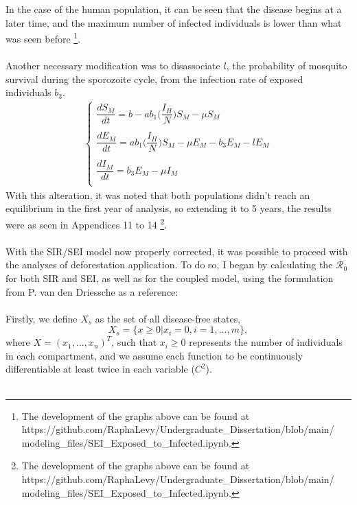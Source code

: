 In the case of the human population, it can be seen that the disease begins 
at a later time, and the maximum number of infected individuals is lower than
what was seen before
\footnote{The development of the graphs above can be found at 
https://github.com/RaphaLevy/Undergraduate\_Dissertation/blob/main/
\\modeling\_files/SEI\_Exposed\_to\_Infected.ipynb.}.
\\\\
Another necessary modification was to disassociate $l$, the probability of mosquito 
survival during the sporozoite cycle, from the infection rate of exposed individuals $b_3$.
\begin{gather*}
        \begin{cases}
        \dfrac{dS_M}{dt} = b - ab_1\bigg(\dfrac{I_H}{N}\bigg)S_M - \mu S_M\\
        \\
        \dfrac{dE_M}{dt} = ab_1\bigg(\dfrac{I_H}{N}\bigg)S_M - \mu E_M - b_3E_M -lE_M\\
        \\
        \dfrac{dI_M}{dt} = b_3E_M -\mu I_M\\
        \end{cases}
        \end{gather*}
With this alteration, it was noted that both populations didn't reach an equilibrium
in the first year of analysis, so extending it to 5 years, the results were as seen in Appendices 11 to 14 
\footnote{The development of the graphs above can be found at 
https://github.com/RaphaLevy/Undergraduate\_Dissertation/blob/main/
\\modeling\_files/SEI\_Exposed\_to\_Infected.ipynb.}. 
\\\\
With the SIR/SEI model now properly corrected, it was possible 
to proceed with the analyses of deforestation application. 
To do so, I began by calculating the $\mathcal{R}_0$ for both SIR and SEI, 
as well as for the coupled model, using the formulation from 
P. van den Driessche \cite{VANDENDRIESSCHE200229} as a reference:
\\\\
Firstly, we define $X_s$ as the set of all disease-free states, 
$$X_s=\{x \geq 0|x_i=0, i=1,\ldots,m\},$$
where $X=(x_1,\ldots, x_n)^T$, such that $x_i\geq 0$ represents the number 
of individuals in each compartment, and we assume each function to be 
continuously differentiable at least twice in each variable ($C^2$).
\\\\
